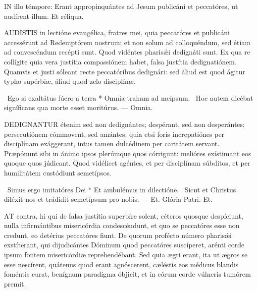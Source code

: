 


\lettrine[lines=2]{I}{N} illo témpore: Erant appropinquántes ad Jesum publicáni et peccatóres, ut audírent illum. Et réliqua.



\lettrine[lines=2]{A}{UDISTIS} in lectióne evangélica, fratres mei, quia peccatóres et publicáni accessérunt ad Redemptórem nostrum; et non solum ad colloquéndum, sed étiam ad convescéndum recépti sunt. Quod vidéntes pharisǽi dedignáti sunt. Ex qua re collígite quia vera justítia compassiónem habet, falsa justítia dedignatiónem. Quamvis et justi sóleant recte peccatóribus dedignári: sed áliud est quod ágitur typho supérbiæ, áliud quod zelo disciplínæ.

\R\ Ego si exaltátus fúero a terra * Omnia traham ad meípsum. \V\ Hoc autem dicébat signíficans qua morte esset moritúrus. --- Omnia.


\lettrine[lines=2]{D}{EDIGNANTUR} étenim sed non dedignántes; despérant, sed non desperántes; persecutiónem cómmovent, sed amántes: quia etsi foris increpatiónes per disciplínam exággerant, intus tamen dulcédinem per caritátem servant. Præpónunt sibi in ánimo ipsos plerúmque quos córrigunt: melióres exístimant eos quoque quos júdicant. Quod vidélicet agéntes, et per disciplínam súbditos, et per humilitátem custódiunt semetípsos.

\R\ Simus ergo imitatóres Dei * Et ambulémus in dilectióne. \V\ Sicut et Christus diléxit nos et trádidit semetípsum pro nobis. --- Et. Glória Patri. Et.


\lettrine[lines=2]{A}{T} contra, hi qui de falsa justítia superbíre solent, céteros quosque despíciunt, nulla infirmántibus misericórdia condescéndunt, et quo se peccatóres esse non credunt, eo detérius peccatóres fiunt. De quorum profécto número pharisǽi exstíterant, qui dijudicántes Dóminum quod peccatóres suscíperet, arénti corde ipsum fontem misericórdiæ reprehendébant. Sed quia ægri erant, ita ut ægros se esse nescírent, quátenus quod erant agnóscerent, cæléstis eos médicus blandis foméntis curat, benígnum paradígma óbjicit, et in eórum corde vúlneris tumórem premit.

